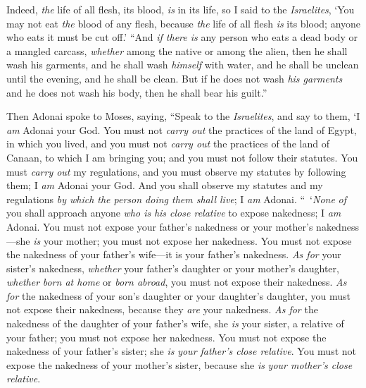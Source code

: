 \begin{biblechapter}
\verse Indeed, \textit{the} life of all flesh, its blood, \textit{is} in its life, so I said to the \textit{Israelites}, ‘You may not eat \textit{the} blood of any flesh, because \textit{the} life of all flesh \textit{is} its blood; anyone who eats it must be cut off.’
\verse “And \textit{if there is} any person who eats a dead body or a mangled carcass, \textit{whether} among the native or among the alien, then he shall wash his garments, and he shall wash \textit{himself} with water, and he shall be unclean until the evening, and he shall be clean.
\verse But if he does not wash \textit{his garments} and he does not wash his body, then he shall bear his guilt.”
\end{biblechapter}

\begin{biblechapter} %
 Then Adonai spoke to Moses, saying,
\verse “Speak to the \textit{Israelites}, and say to them, ‘I \textit{am} Adonai your God.
\verse You must not \textit{carry out} the practices of the land of Egypt, in which you lived, and you must not \textit{carry out} the practices of the land of Canaan, to which I am bringing you; and you must not follow their statutes.
\verse You must \textit{carry out} my regulations, and you must observe my statutes by following them; I \textit{am} Adonai your God.
\verse And you shall observe my statutes and my regulations \textit{by which the person doing them shall live}; I \textit{am} Adonai.
\verse “ ‘\textit{None} \textit{of} you shall approach anyone \textit{who is} \textit{his close relative} to expose nakedness; I \textit{am} Adonai.
\verse You must not expose your father’s nakedness or your mother’s nakedness—she \textit{is} your mother; you must not expose her nakedness.
\verse You must not expose the nakedness of your father’s wife—it is your father’s nakedness.
\verse \textit{As for} your sister’s nakedness, \textit{whether} your father’s daughter or your mother’s daughter, \textit{whether} \textit{born at home} or \textit{born abroad}, you must not expose their nakedness.
\verse \textit{As for} the nakedness of your son’s daughter or your daughter’s daughter, you must not expose their nakedness, because they \textit{are} your nakedness.
\verse \textit{As for} the nakedness of the daughter of your father’s wife, she \textit{is} your sister, a relative of your father; you must not expose her nakedness.
\verse You must not expose the nakedness of your father’s sister; she \textit{is} \textit{your father’s close relative}.
\verse You must not expose the nakedness of your mother’s sister, because she \textit{is} \textit{your mother’s close relative}.

\end{biblechapter}
